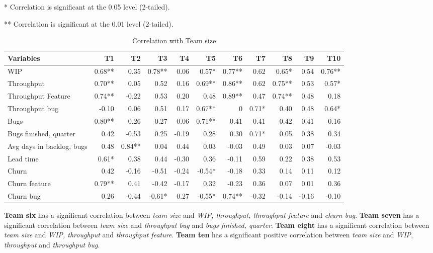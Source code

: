 \documentclass[UKenglish]{ifimaster}  %
\begin{document}
 \begin{table}[!htbp]
  \begin{adjustwidth}{-1.0cm}{}
   \caption{Correlation with Team size}
    \centerline {* Correlation is significant at the 0.05 level (2-tailed).}
\centerline{** Correlation is significant at the 0.01 level (2-tailed).}
 \centering
 \begin{tabular}{|l|r|r|r|r|r|r|r|r|r|r|}
\hline
 \textbf{Variables} & \bf{T1} & \bf{T2} & \bf{T3} & \bf{T4} & \bf{T5} & \bf{T6} & \bf{T7} & \bf{T8} & \bf{T9} & \bf{T10}\\ \hline
 WIP  & 0.68** & 0.35 & 0.78** & 0.06 & 0.57* & 0.77** & 0.62 & 0.65* & 0.54 & 0.76** \\ \hline
 Throughput  & 0.70** & 0.05 & 0.52 & 0.16 & 0.69** & 0.86** & 0.62 & 0.75** & 0.53 & 0.57* \\ \hline
 Throughput Feature  & 0.74** & -0.22 & 0.53 & 0.20 & 0.48 & 0.89** & 0.47 & 0.74** & 0.48 & 0.18 \\ \hline
 Throughput bug  & -0.10 & 0.06 & 0.51 & 0.17 & 0.67** & 0 &0.71* & 0.40 & 0.48 & 0.64* \\ \hline
 Bugs  & 0.80** & 0.26 & 0.27 & 0.06 & 0.71** & 0.41 & 0.41 & 0.42 & 0.41 & 0.16 \\ \hline
 Bugs finished, quarter  & 0.42 & -0.53 & 0.25 & -0.19 & 0.28 & 0.30 & 0.71* & 0.05 & 0.38 & 0.34 \\ \hline
 Avg days in backlog, bugs  & 0.48 & 0.84** & 0.04 & 0.44 & 0.03 & -0.03 & 0.49 & 0.03 & 0.07 & -0.03 \\ \hline
 Lead time  & 0.61* & 0.38 & 0.44 & -0.30 & 0.36 & -0.11 & 0.59 & 0.22 & 0.38 & 0.53 \\ \hline
 Churn  & 0.42 & -0.16 & -0.51 & -0.24 & -0.54* & -0.18 & 0.33 & 0.14 & 0.11 & 0.12 \\ \hline
 Churn feature  & 0.79** & 0.41 & -0.42 & -0.17 & 0.32 & -0.23 & 0.36 & 0.07 & 0.01 & 0.36 \\ \hline
 Churn bug  & 0.26 & -0.44 & -0.61* & 0.27 & -0.55* & 0.74** & -0.32 & -0.14 & -0.16 & -0.10 \\ \hline
\end{tabular}
 \label{corr:Teams}

\end{adjustwidth}
\end{table}
\textbf{Team six} has a significant correlation between \textit{team size} and \textit{WIP, throughput, throughput feature} and \textit{churn bug}. \textbf{Team seven} has a significant correlation between \textit{team size} and \textit{throughput bug} and \textit{bugs finished, quarter}. \textbf{Team eight} has a significant correlation between \textit{team size} and \textit{WIP, throughput} and \textit{throughput feature}. \textbf{Team ten} has a significant positive correlation between \textit{team size} and  \textit{WIP}, \textit{throughput} and \textit{throughput bug}. 
\end{document}
